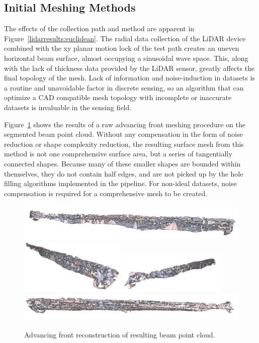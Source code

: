 \documentclass[12pt]{drexelthesis}
\let\Oldsubsection\subsection
\renewcommand{\subsection}{\FloatBarrier\Oldsubsection}
\begin{document}
\subsection{Initial Meshing Methods}

The effects of the collection path and method are apparent in Figure~\ref{lidarresults:euclidean}. The radial data collection of the LiDAR device combined with the xy planar motion lock of the test path creates an uneven horizontal beam surface, almost occupying a sinusoidal wave space. This, along with the lack of thickness data provided by the LiDAR sensor, greatly affects the final topology of the mesh. Lack of information and noise-induction in datasets is a routine and unavoidable factor in discrete sensing, so an algorithm that can optimize a CAD compatible mesh topology with incomplete or inaccurate datasets is invaluable in the sensing field.

Figure~\ref{lidar:advancefront} shows the results of a raw advancing front meshing procedure on the segmented beam point cloud. Without any compensation in the form of noise reduction or shape complexity reduction, the resulting surface mesh from this method is not one comprehensive surface area, but a series of tangentially connected shapes. Because many of these smaller shapes are bounded within themselves, they do not contain half edges, and are not picked up by the hole filling algorithms implemented in the pipeline. For non-ideal datasets, noise compensation is required for a comprehensive mesh to be created.


\begin{figure}[!ht]
	\centering
		\includegraphics[width=5in]{real-lab-scans/meshedNeat/advancedfront00.png}
		\includegraphics[width=2in]{real-lab-scans/meshedNeat/advancedfront01.png}
		\includegraphics[width=2in]{real-lab-scans/meshedNeat/advancedfront02.png}
		\includegraphics[width=5in]{real-lab-scans/meshedNeat/advancedfront03.png}
		\caption[Advancing front reconstruction of segmented LiDAR data]{\centering Advancing front reconstruction of resulting beam point cloud.}
	\label{lidar:advancefront}
\end{figure}
\end{document}
